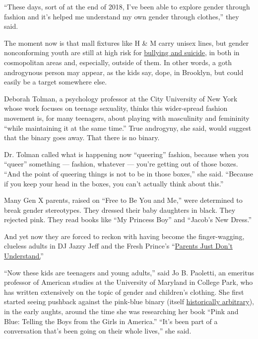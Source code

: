 ``These days, sort of at the end of 2018, I've been able to explore
gender through fashion and it's helped me understand my own gender
through clothes,'' they said.

The moment now is that mall fixtures like H \& M carry unisex lines, but
gender nonconforming youth are still at high risk for
\href{https://www.hrc.org/blog/new-cdc-report-highlights-need-to-support-trans-and-gender-non-conforming-y}{bullying
and suicide}, in both in cosmopolitan areas and, especially, outside of
them. In other words, a goth androgynous person may appear, as the kids
say, dope, in Brooklyn, but could easily be a target somewhere else.

Deborah Tolman, a psychology professor at the City University of New
York whose work focuses on teenage sexuality, thinks this wider-spread
fashion movement is, for many teenagers, about playing with masculinity
and femininity ``while maintaining it at the same time.'' True
androgyny, she said, would suggest that the binary goes away. That there
is no binary.

Dr. Tolman called what is happening now ``queering'' fashion, because
when you ``queer'' something --- fashion, whatever --- you're getting
out of those boxes. ``And the point of queering things is not to be in
those boxes,'' she said. ``Because if you keep your head in the boxes,
you can't actually think about this.''

Many Gen X parents, raised on ``Free to Be You and Me,'' were determined
to break gender stereotypes. They dressed their baby daughters in black.
They rejected pink. They read books like ``My Princess Boy'' and
``Jacob's New Dress.''

And yet now they are forced to reckon with having become the
finger-wagging, clueless adults in DJ Jazzy Jeff and the Fresh Prince's
``\href{https://www.youtube.com/watch?v=jW3PFC86UNI}{Parents Just Don't
Understand.}''

``Now these kids are teenagers and young adults,'' said Jo B. Paoletti,
an emeritus professor of American studies at the University of Maryland
in College Park, who has written extensively on the topic of gender and
children's clothing. She first started seeing pushback against the
pink-blue binary (itself
\href{https://www.smithsonianmag.com/arts-culture/when-did-girls-start-wearing-pink-1370097/}{historically
arbitrary}), in the early aughts, around the time she was researching
her book ``Pink and Blue: Telling the Boys from the Girls in America.''
``It's been part of a conversation that's been going on their whole
lives,'' she said.

